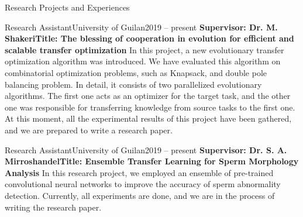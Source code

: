 \documentclass[]{mcdowellcv}
\begin{document}
\begin{cvsection}{Research Projects and Experiences}
    	
    	\begin{cvsubsection}{Research Assistant}{University of Guilan}{2019 -- present}
    	    \setlength{\columnsep}{-2.1in}
    	    \textbf{Supervisor: Dr. M. Shakeri\newline Title: The blessing of cooperation in evolution for efficient and scalable transfer optimization} \newline
            In this project, a new evolutionary transfer optimization algorithm was introduced. We have evaluated this algorithm on combinatorial optimization problems, such as Knapsack, and double pole balancing problem. In detail, it consists of two parallelized evolutionary algorithms. The first one acts as an optimizer for the target task, and the other one was responsible for transferring knowledge from source tasks to the first one. At this moment, all the experimental results of this project have been gathered, and we are prepared to write a research paper.
    	\end{cvsubsection}
    	
    	
    	\begin{cvsubsection}{Research Assistant}{University of Guilan}{2019 -- present}
    	    \setlength{\columnsep}{-2.1in}
    	    \textbf{Supervisor: Dr. S. A. Mirroshandel\newline Title: Ensemble Transfer Learning for Sperm Morphology Analysis} \newline
            In this research project, we employed an ensemble of pre-trained convolutional neural networks to improve the accuracy of sperm abnormality detection. Currently, all experiments are done, and we are in the process of writing the research paper.

    	\end{cvsubsection}
    	
	\end{cvsection}
    
\end{document}
